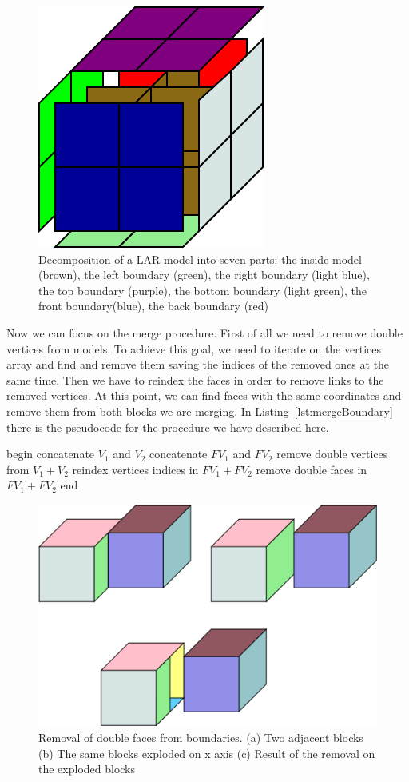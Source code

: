\begin{figure}[htb] %
   \centering
   \includegraphics[width=0.25\linewidth]{images/boundaries.png}
   \caption[Decomposition of a LAR model into seven parts]{Decomposition of a LAR model into seven parts: the inside model (brown), the left boundary (green), the right boundary (light blue), the top boundary (purple), the bottom boundary (light green), the front boundary(blue), the back boundary (red)}
   \label{fig:boundaries}
\end{figure}

Now we can focus on the merge procedure. First of all we need to remove double vertices from models. To achieve this goal, we need to iterate on the vertices array and find and remove them saving the indices of the removed ones at the same time. Then we have to reindex the faces in order to remove links to the removed vertices. At this point, we can find faces with the same coordinates and remove them from both blocks we are merging. In Listing~\ref{lst:mergeBoundary} there is the pseudocode for the procedure we have described here.

\begin{pseudo}[caption={Merging of two boundaries}, label={lst:mergeBoundary}]
begin
  concatenate $V_1$ and $V_2$
  concatenate $FV_1$ and $FV_2$
  remove double vertices from $V_1 + V_2$
  reindex vertices indices in $FV_1 + FV_2$
  remove double faces in $FV_1 + FV_2$
end
\end{pseudo}

\begin{figure}[htb] %
   \centering
   \includegraphics[width=0.40\linewidth]{images/BoundaryMerge.png}
   \caption[Removal of double faces from boundaries]{Removal of double faces from boundaries. (a) Two adjacent blocks (b) The same blocks exploded on x axis (c) Result of the removal on the exploded blocks}
   \label{fig:boundaryMerge}
\end{figure}

